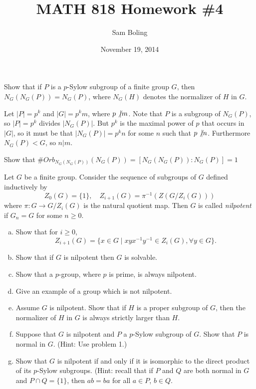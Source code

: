 \documentclass{article}
\title{MATH 818 Homework \#4}
\date{November 19, 2014}
\author{Sam Boling}
\newcounter{Problem}
\newenvironment{Problem}{\begin{Exercise}[name={Problem},
                                          counter={Problem}]}
                        {\end{Exercise}}
\begin{document}
\begin{titlepage}
\maketitle
\end{titlepage}

\begin{Problem}
Show that if $P$ is a $p$-Sylow subgroup of a finite group $G$, then
$N_G(N_G(P)) = N_G(P)$, where $N_G(H)$ denotes the normalizer of $H$
in $G$.
\end{Problem}

\begin{Answer}
Let $|P| = p^k$ and $|G| = p^k m$, where $p \not\vert m$.
Note that $P$ is a subgroup of $N_G(P)$, so $|P| =
p^k$ divides $|N_G(P)|$. But $p^k$ is the maximal power of $p$ that
occurs in $|G|$, so it must be that $|N_G(P)| = p^k n$ for some $n$
such that $p \not\vert n$. Furthermore $N_G(P) < G$, so $n \vert m$.

 Show that $\#Orb_{N_G(N_G(P))}(N_G(P)) = [N_G(N_G(P)) : N_G(P)] = 1$

\end{Answer}

\pagebreak

\begin{Problem}
Let $G$ be a finite group. Consider the sequence of subgroups of $G$
defined inductively by
$$
Z_0(G) = \{ 1 \}, \quad
Z_{i+1}(G) = \pi^{-1}(Z(G/Z_i(G)))
$$
where $\pi : G \to G / Z_i(G)$ is the natural quotient map. Then $G$
is called \emph{nilpotent} if $G_n = G$ for some $n \geq 0$.

\begin{enumerate}[(a)]
  \item{
    Show that for $i \geq 0$,
    $$
    Z_{i+1}(G) = \{ x \in G
                   \mid
                   xyx^{-1}y^{-1} \in Z_i(G), \forall y \in G
                \}.
    $$
  }
  \item{
    Show that if $G$ is nilpotent then $G$ is solvable.
  }
  \item{
    Show that a $p$-group, where $p$ is prime, is always nilpotent.
  }
  \item{
    Give an example of a group which is not nilpotent.
  }
  \item{
    Assume $G$ is nilpotent. Show that if $H$ is a proper subgroup of $G$, then
    the normalizer of $H$ in $G$ is always strictly larger than $H$.
  }
  \item{
    Suppose that $G$ is nilpotent and $P$ a $p$-Sylow subgroup of
    $G$. Show that $P$ is normal in $G$. (Hint: Use problem 1.)
  }
  \item{
    Show that $G$ is nilpotent if and only if it is isomorphic to the
    direct product of its $p$-Sylow subgroups. (Hint: recall that if
    $P$ and $Q$ are both normal in $G$ and $P \cap Q = \{ 1 \}$, then
    $ab = ba$ for all $a \in P$, $b \in Q$.
  }
\end{enumerate}
\end{Problem}
\end{document}
